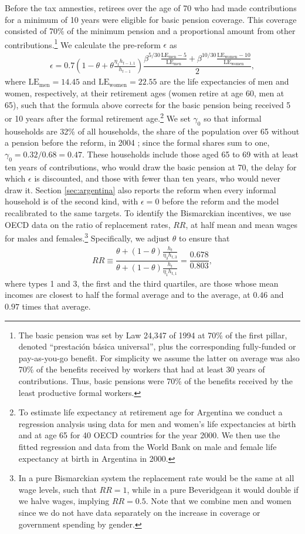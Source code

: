 Before the tax amnesties, retirees over the age of 70 who had made contributions for a minimum of 10 years were eligible for basic pension coverage. This coverage consisted of 70\% of the minimum pension and a proportional amount from other contributions.\footnote{The basic pension was set by Law 24,347 of 1994 at 70\% of the first pillar, denoted ``prestaci\'on b\'asica universal'', plus the corresponding fully-funded or pay-as-you-go benefit. For simplicity we assume the latter on average was also 70\% of the benefits received by workers that had at least 30 years of contributions. Thus, basic pensions were 70\% of the benefits received by the least productive formal workers.} We calculate the pre-reform $\epsilon$ as \begin{align*}
        \epsilon = 0.7 \left(1-\theta+\theta\frac{\eta_1h_{t-1,1}}{h_{t-1}}\right)\dfrac{\beta^{5/30} \frac{\mathrm{LE_{men}-5}}{\mathrm{LE_{men}}}+\beta^{10/30} \frac{\mathrm{LE_{women}-10}}{\mathrm{LE_{women}}}}{2},
    \end{align*}
where $\mathrm{LE_{men}}=14.45$ and $\mathrm{LE_{women}}=22.55$ are the life expectancies of men and women, respectively, at their retirement ages (women retire at age 60, men at 65), such that the formula above corrects for the basic pension being received 5 or 10 years after the formal retirement age.\footnote{To estimate life expectancy at retirement age for Argentina we conduct a regression analysis using data for men and women's life expectancies at birth and at age 65 for 40 OECD countries for the year 2000. We then use the fitted regression and data from the World Bank on male and female life expectancy at birth in Argentina in 2000.} We set $\gamma_0$ so that informal households are 32\% of all households, the share of the population over 65 without a pension before the reform, in 2004 \parencite{Roffman}; since the formal shares sum to one, $\gamma_0 = 0.32/0.68 = 0.47$. These households include those aged 65 to 69 with at least ten years of contributions, who would draw the basic pension at 70, the delay for which $\epsilon$ is discounted, and those with fewer than ten years, who would never draw it. Section \ref{sec:argentina} also reports the reform when every informal household is of the second kind, with $\epsilon = 0$ before the reform and the model recalibrated to the same targets. To identify the Bismarckian incentives, we use OECD data on the ratio of replacement rates, $RR$, at half mean and mean wages for males and females.\footnote{In a pure Bismarckian system the replacement rate would be the same at all wage levels, such that $RR=1$, while in a pure Beveridgean it would double if we halve wages, implying $RR=0.5$. Note that we combine men and women since we do not have data separately on the increase in coverage or government spending by gender.} Specifically, we adjust $\theta$ to ensure that
    \begin{align*}
        RR \equiv \dfrac{\theta+(1-\theta)\frac{h_t}{\eta_3h_{t,3}}}{\theta+(1-\theta)\frac{h_t}{\eta_1h_{t,1}}}= \dfrac{0.678}{0.803},
    \end{align*}
where types 1 and 3, the first and the third quartiles, are those whose mean incomes are closest to half the formal average and to the average, at $0.46$ and $0.97$ times that average.

